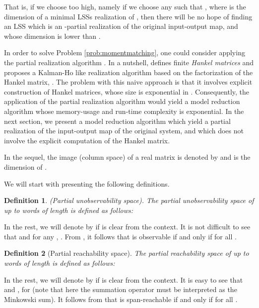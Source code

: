 \documentclass[journal]{IEEEtran}
\newtheorem{Definition}{Definition}
\begin{document}
That is, if we choose  too high, namely if we choose any  such that , where  is the dimension of a minimal LSSs realization of , then there will be no hope of finding an LSS which is an -partial realization of the original input-output map, and whose dimension is lower than .


In order to solve Problem \ref{prob:momentmatching}, one could consider applying the partial realization algorithm \cite{petreczky}. In a nutshell, \cite{petreczky} defines finite \emph{Hankel matrices} and proposes a Kalman-Ho like realization algorithm based on the factorization of the Hankel matrix, \cite[Algorithm 1]{petreczky}. The problem with this naive approach is that it involves explicit construction of Hankel matrices, whose size is exponential in . Consequently, the application of the partial realization algorithm would yield a model reduction algorithm whose memory-usage and run-time complexity is exponential. In the next section, we present a model reduction algorithm which yield a partial realization of the input-output map of the original system, and which does not involve the explicit computation of the Hankel matrix.





In the sequel, the image (column space) of a real matrix  is denoted by  and  is the dimension of . 



We will start with presenting the following definitions.

\begin{Definition} \label{ObservabilityMat}
	\emph{(Partial unobservability space).}
The partial unobservability space  of  up to words of length  is defined as follows:
	
\end{Definition}

In the rest, we will denote  by  if  is clear from the context. It is not difficult to see that  and for any , . From \cite{Sun:Book,MP:BigArticlePartI}, it follows that  is observable if and only if  for all .

\begin{Definition}[Partial reachability space] \label{ReachabilityMat}
The partial reachability space  of  up to words of length  is defined as follows:
	
\end{Definition}

In the rest, we will denote  by  if  is clear from the context. It is easy to see that  and , for  (note that here the summation operator must be interpreted as the Minkowski sum). It follows from \cite{MP:BigArticlePartI,Sun:Book} that  is span-reachable if and only if  for all .
\end{document}
